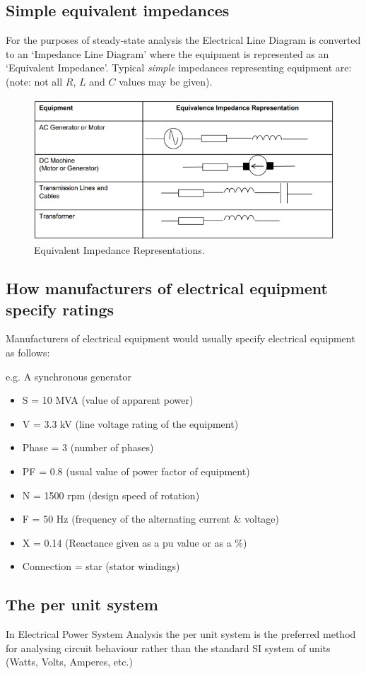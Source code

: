 \documentclass[class=report, crop=false, 12pt,a4paper]{standalone}
\begin{document}
\subsection{Simple equivalent impedances}
For the purposes of steady-state analysis the Electrical Line Diagram is converted to an `Impedance Line Diagram' where the equipment is represented as an `Equivalent Impedance'. Typical \textit{simple} impedances representing equipment are: (note: not all $R$, $L$ and $C$ values may be given).
\begin{figure}[H]
	\centering
	\includegraphics[width = \textwidth]{../img/figure11.png}
	\caption{Equivalent Impedance Representations.}
\end{figure}
\subsection{How manufacturers of electrical equipment specify ratings}
Manufacturers of electrical equipment would usually specify electrical equipment as follows:

e.g. A synchronous generator
\begin{itemize}
	\item S = 10 MVA (value of apparent power)
	\item V = 3.3 kV (line voltage rating of the equipment)
	\item Phase = 3 (number of phases)
	\item PF = 0.8 (usual value of power factor of equipment)
	\item N = 1500 rpm (design speed of rotation)
	\item F = 50 Hz (frequency of the alternating current \& voltage)
	\item X = 0.14 (Reactance given as a pu value or as a \%)
	\item Connection = star (stator windings)
\end{itemize}
\subsection{The per unit system}
In Electrical Power System Analysis the per unit system is the preferred method for analysing circuit behaviour rather than the standard SI system of units (Watts, Volts, Amperes, etc.)
\end{document}
